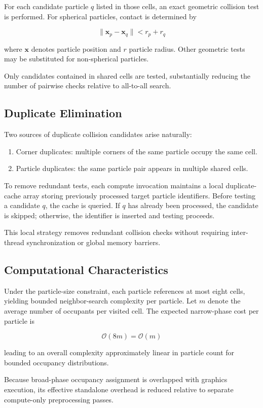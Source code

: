 For each candidate particle $q$ listed in those cells, an exact geometric collision test is performed. For spherical particles, contact is determined by

\[
\|\mathbf{x}_p - \mathbf{x}_q\| < r_p + r_q
\]

where $\mathbf{x}$ denotes particle position and $r$ particle radius. Other geometric tests may be substituted for non-spherical particles.

Only candidates contained in shared cells are tested, substantially reducing the number of pairwise checks relative to all-to-all search.

\subsection{Duplicate Elimination}

Two sources of duplicate collision candidates arise naturally:

\begin{enumerate}
    \item Corner duplicates: multiple corners of the same particle occupy the same cell.
    \item Particle duplicates: the same particle pair appears in multiple shared cells.
\end{enumerate}

To remove redundant tests, each compute invocation maintains a local duplicate-cache array storing previously processed target particle identifiers. Before testing a candidate $q$, the cache is queried. If $q$ has already been processed, the candidate is skipped; otherwise, the identifier is inserted and testing proceeds.

This local strategy removes redundant collision checks without requiring inter-thread synchronization or global memory barriers.

\subsection{Computational Characteristics}

Under the particle-size constraint, each particle references at most eight cells, yielding bounded neighbor-search complexity per particle. Let $m$ denote the average number of occupants per visited cell. The expected narrow-phase cost per particle is

\[
\mathcal{O}(8m) = \mathcal{O}(m)
\]

leading to an overall complexity approximately linear in particle count for bounded occupancy distributions.

Because broad-phase occupancy assignment is overlapped with graphics execution, its effective standalone overhead is reduced relative to separate compute-only preprocessing passes.
